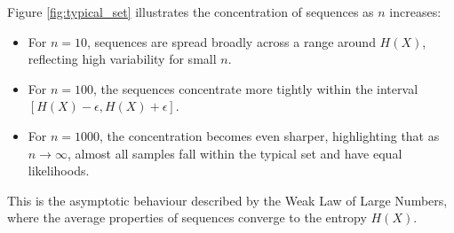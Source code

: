 Figure \ref{fig:typical_set} illustrates the concentration of sequences as $n$ increases:
\begin{itemize}
    \item For $n = 10$, sequences are spread broadly across a range around $H(X)$, reflecting high variability for small $n$.
    \item For $n = 100$, the sequences concentrate more tightly within the interval $[H(X) - \epsilon, H(X) + \epsilon]$.
    \item For $n = 1000$, the concentration becomes even sharper, highlighting that as $n \to \infty$, almost all samples fall within the typical set and have equal likelihoods.
\end{itemize}
This is the asymptotic behaviour described by the Weak Law of Large Numbers, where the average properties of sequences converge to the entropy $H(X)$.


